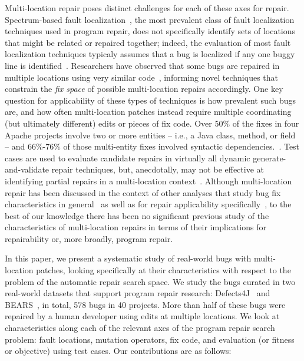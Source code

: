 \documentclass[sigconf, timestamp-false, anonymous=true]{acmart}
\begin{document}
Multi-location repair poses distinct challenges for each of these axes for repair.
Spectrum-based fault localization~\cite{ochiai}, the most prevalent class of
fault localization techniques used in program repair, does not specifically
identify sets of locations that might be related or repaired together; indeed,
the evaluation of most fault localization techniques typicaly assumes that a bug
is localized if any one buggy line is identified~\cite{fl-survey-wong}.
Researchers have observed that some bugs are
repaired in multiple locations using very similar
code~\cite{saha2019harnessing,jiang2019cmsuggester}, informing novel techniques
that constrain the \emph{fix space} of possible multi-location repairs accordingly.
One key question for applicability of these types of techniques is how prevalent
such bugs are, and how often multi-location patches instead require multiple
coordinating (but ultimately different) edits or pieces of fix code.  Over 50\% of the fixes in four 
Apache projects involve two or more entities -- i.e., a Java class, method, or field -- and 66\%-76\% of 
those multi-entity fixes involved syntactic dependencies.~\cite{wang2018}. 
Test cases are used to evaluate candidate repairs in virtually all dynamic
generate-and-validate repair techniques, but, anecdotally, may not be effective
at identifying partial repairs in a multi-location
context~\cite{fitness10,maybeeric}.  
Although multi-location repair has been discussed in the context of other analyses
that study bug fix characteristics in general~\cite{examples} as well as for
repair applicability specifically~\cite{moar,examples}, to the best of our
knowledge there has been no significant previous study of the characteristics of
multi-location repairs in terms of their implications for repairability or, more
broadly, program repair.  

In this paper, we present a systematic study of real-world bugs with
multi-location patches,
looking specifically at their characteristics with respect to the problem of the
automatic repair search space.  
We study the bugs curated in two
real-world datasets that support program repair research: Defects4J~\cite{defects4j}
and BEARS~\cite{bears}, in total, 578 bugs in 40 projects. 
More than half of these bugs were repaired by a
human developer using edits at multiple locations.  We look at characteristics along each of the
relevant axes of the program repair search problem: fault locations, mutation
operators, fix code, and evaluation (or fitness or objective) using test cases.  Our 
contributions are
as follows:
\end{document}
